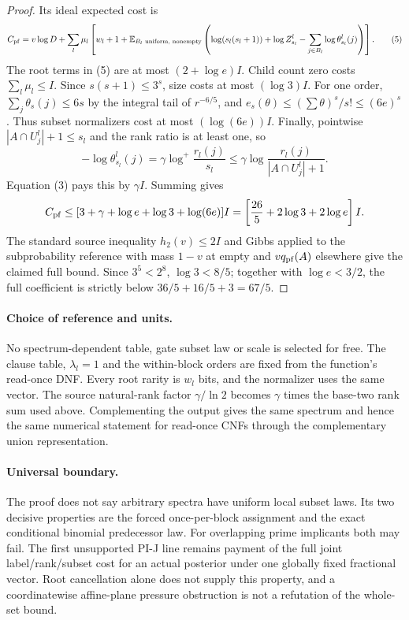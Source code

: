 \documentclass{article}
\begin{document}
\begin{proof}
Its ideal expected cost is
\[
 C_{\rm pf}=v\log D+\sum_l\mu_l\left[w_l+1+
   \mathbb E_{B_l\text{ uniform, nonempty}}
   \left(\log(s_l(s_l+1))+\log Z_{s_l}^l
       -\sum_{j\in B_l}\log\theta_{s_l}^l(j)\right)\right].
 \tag{5}
\]
The root terms in (5) are at most $(2+\log e)I$. Child count zero costs $\sum_l\mu_l\le I$. Since $s(s+1)\le3^s$, size costs at most $(\log3)I$. For one order, $\sum_j\theta_s(j)\le6s$ by the integral tail of $r^{-6/5}$, and $e_s(\theta)\le(\sum\theta)^s/s!\le(6e)^s$. Thus subset normalizers cost at most $(\log(6e))I$. Finally, pointwise $|A\cap U_j^l|+1\le s_l$ and the rank ratio is at least one, so
\[
 -\log\theta_{s_l}^l(j)=\gamma\log^+\frac{r_l(j)}{s_l}
 \le\gamma\log\frac{r_l(j)}{|A\cap U_j^l|+1}.
\]
Equation (3) pays this by $\gamma I$. Summing gives
\[
 C_{\rm pf}\le[3+\gamma+\log e+\log3+\log(6e)]I
 =\left[\frac{26}{5}+2\log3+2\log e\right]I.
\]
The standard source inequality $h_2(v)\le2I$ and Gibbs applied to the subprobability reference with mass $1-v$ at empty and $v q_{\rm pf}(A)$ elsewhere give the claimed full bound. Since $3^5<2^8$, $\log3<8/5$; together with $\log e<3/2$, the full coefficient is strictly below $36/5+16/5+3=67/5$.
\end{proof}

\paragraph{Choice of reference and units.}
No spectrum-dependent table, gate subset law or scale is selected for free. The clause table, $\lambda_l=1$ and the within-block orders are fixed from the function's read-once DNF. Every root rarity is $w_l$ bits, and the normalizer uses the same vector. The source natural-rank factor $\gamma/\ln2$ becomes $\gamma$ times the base-two rank sum used above. Complementing the output gives the same spectrum and hence the same numerical statement for read-once CNFs through the complementary union representation.

\paragraph{Universal boundary.}
The proof does not say arbitrary spectra have uniform local subset laws. Its two decisive properties are the forced once-per-block assignment and the exact conditional binomial predecessor law. For overlapping prime implicants both may fail. The first unsupported PI-J line remains payment of the full joint label/rank/subset cost for an actual posterior under one globally fixed fractional vector. Root cancellation alone does not supply this property, and a coordinatewise affine-plane pressure obstruction is not a refutation of the whole-set bound.
\end{document}
